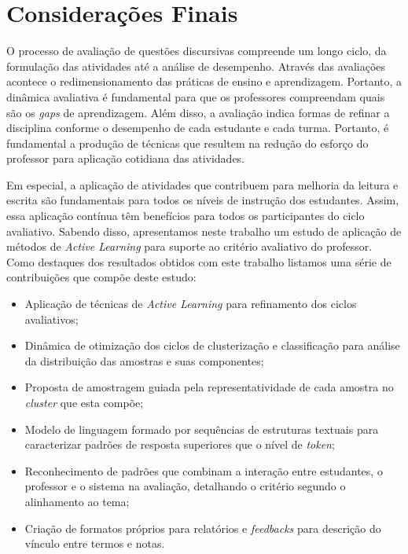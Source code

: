 \chapter{Considerações Finais}
\label{cap-conclusao}

O processo de avaliação de questões discursivas compreende um longo ciclo, da formulação das atividades até a análise de desempenho. Através das avaliações acontece o redimensionamento das práticas de ensino e aprendizagem. Portanto, a dinâmica avaliativa é fundamental para que os professores compreendam quais são os \textit{gaps} de aprendizagem. Além disso, a avaliação indica formas de refinar a disciplina conforme o desempenho de cada estudante e cada turma. Portanto, é fundamental a produção de técnicas que resultem na redução do esforço do professor para aplicação cotidiana das atividades.

Em especial, a aplicação de atividades que contribuem para melhoria da leitura e escrita são fundamentais para todos os níveis de instrução dos estudantes. Assim, essa aplicação contínua têm benefícios para todos os participantes do ciclo avaliativo. Sabendo disso, apresentamos neste trabalho um estudo de aplicação de métodos de \textit{Active Learning} para suporte ao critério avaliativo do professor. Como destaques dos resultados obtidos com este trabalho listamos uma série de contribuições que compõe deste estudo:

\begin{itemize}
  \item Aplicação de técnicas de \textit{Active Learning} para refinamento dos ciclos avaliativos;
  \item Dinâmica de otimização dos ciclos de clusterização e classificação para análise da distribuição das amostras e suas componentes;
  \item Proposta de amostragem guiada pela representatividade de cada amostra no \textit{cluster} que esta compõe;
  \item Modelo de linguagem formado por sequências de estruturas textuais para caracterizar padrões de resposta superiores que o nível de \textit{token};
  \item Reconhecimento de padrões que combinam a interação entre estudantes, o professor e o sistema na avaliação, detalhando o critério segundo o alinhamento ao tema;
  \item Criação de formatos próprios para relatórios e \textit{feedbacks} para descrição do vínculo entre termos e notas.
\end{itemize}

